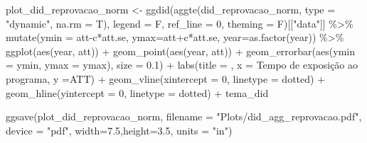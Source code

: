 \documentclass[
  letterpaper,
  DIV=11,
  numbers=noendperiod]{scrartcl}
\newenvironment{Shaded}{\begin{snugshade}}{\end{snugshade}}
\newcommand{\AttributeTok}[1]{\textcolor[rgb]{0.40,0.45,0.13}{#1}}
\newcommand{\DecValTok}[1]{\textcolor[rgb]{0.68,0.00,0.00}{#1}}
\newcommand{\FloatTok}[1]{\textcolor[rgb]{0.68,0.00,0.00}{#1}}
\newcommand{\FunctionTok}[1]{\textcolor[rgb]{0.28,0.35,0.67}{#1}}
\newcommand{\NormalTok}[1]{\textcolor[rgb]{0.00,0.23,0.31}{#1}}
\newcommand{\OtherTok}[1]{\textcolor[rgb]{0.00,0.23,0.31}{#1}}
\newcommand{\SpecialCharTok}[1]{\textcolor[rgb]{0.37,0.37,0.37}{#1}}
\newcommand{\StringTok}[1]{\textcolor[rgb]{0.13,0.47,0.30}{#1}}
\begin{document}
\begin{Shaded}
\begin{Highlighting}[]
\NormalTok{plot\_did\_reprovacao\_norm }\OtherTok{\textless{}{-}}
\FunctionTok{ggdid}\NormalTok{(}\FunctionTok{aggte}\NormalTok{(did\_reprovacao\_norm, }\AttributeTok{type =} \StringTok{"dynamic"}\NormalTok{, }\AttributeTok{na.rm =}\NormalTok{ T),       }
      \AttributeTok{legend =}\NormalTok{ F, }\AttributeTok{ref\_line =} \DecValTok{0}\NormalTok{, }\AttributeTok{theming =}\NormalTok{ F)[[}\StringTok{"data"}\NormalTok{]] }\SpecialCharTok{\%\textgreater{}\%} 
    \FunctionTok{mutate}\NormalTok{(}\AttributeTok{ymin =}\NormalTok{ att}\SpecialCharTok{{-}}\NormalTok{c}\SpecialCharTok{*}\NormalTok{att.se, }\AttributeTok{ymax=}\NormalTok{att}\SpecialCharTok{+}\NormalTok{c}\SpecialCharTok{*}\NormalTok{att.se, }\AttributeTok{year=}\FunctionTok{as.factor}\NormalTok{(year)) }\SpecialCharTok{\%\textgreater{}\%} 
    \FunctionTok{ggplot}\NormalTok{(}\FunctionTok{aes}\NormalTok{(year, att)) }\SpecialCharTok{+}
    \FunctionTok{geom\_point}\NormalTok{(}\FunctionTok{aes}\NormalTok{(year, att)) }\SpecialCharTok{+}
    \FunctionTok{geom\_errorbar}\NormalTok{(}\FunctionTok{aes}\NormalTok{(}\AttributeTok{ymin =}\NormalTok{ ymin, }\AttributeTok{ymax =}\NormalTok{ ymax), }\AttributeTok{size =} \FloatTok{0.1}\NormalTok{) }\SpecialCharTok{+}
    \FunctionTok{labs}\NormalTok{(}\AttributeTok{title =} \StringTok{\textquotesingle{}\textquotesingle{}}\NormalTok{,}
         \AttributeTok{x =} \StringTok{\textquotesingle{}Tempo de exposição ao programa\textquotesingle{}}\NormalTok{,}
         \AttributeTok{y =}\StringTok{\textquotesingle{}ATT\textquotesingle{}}\NormalTok{) }\SpecialCharTok{+}
    \FunctionTok{geom\_vline}\NormalTok{(}\AttributeTok{xintercept =} \StringTok{\textquotesingle{}0\textquotesingle{}}\NormalTok{, }\AttributeTok{linetype =} \StringTok{\textquotesingle{}dotted\textquotesingle{}}\NormalTok{) }\SpecialCharTok{+}
    \FunctionTok{geom\_hline}\NormalTok{(}\AttributeTok{yintercept =} \DecValTok{0}\NormalTok{, }\AttributeTok{linetype =} \StringTok{\textquotesingle{}dotted\textquotesingle{}}\NormalTok{) }\SpecialCharTok{+}
\NormalTok{    tema\_did}

\FunctionTok{ggsave}\NormalTok{(plot\_did\_reprovacao\_norm, }
       \AttributeTok{filename =} \StringTok{"Plots/did\_agg\_reprovacao.pdf"}\NormalTok{,}
       \AttributeTok{device =} \StringTok{"pdf"}\NormalTok{,}
       \AttributeTok{width=}\FloatTok{7.5}\NormalTok{,}\AttributeTok{height=}\FloatTok{3.5}\NormalTok{, }\AttributeTok{units =} \StringTok{"in"}\NormalTok{)}


\end{Highlighting}
\end{Shaded}
\end{document}
